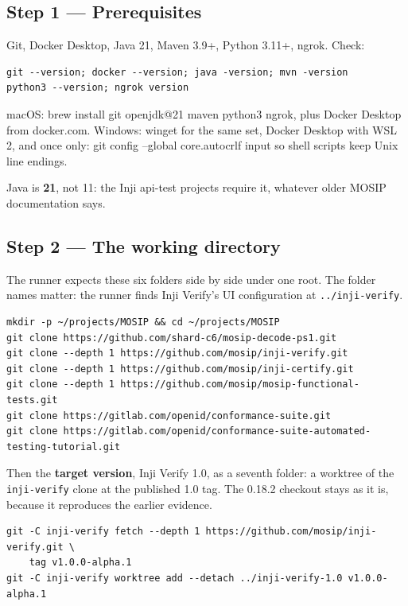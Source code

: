 \documentclass[10pt,a4paper]{article}
\newcommand{\cmd}[1]{\colorbox{box}{#1}}
\begin{document}
\subsection{Step 1 --- Prerequisites}

Git, Docker Desktop, Java 21, Maven 3.9+, Python 3.11+, ngrok. Check:

\begin{verbatim}
git --version; docker --version; java -version; mvn -version
python3 --version; ngrok version
\end{verbatim}

macOS: \cmd{brew install git openjdk@21 maven python3 ngrok}, plus Docker Desktop from
docker.com. Windows: winget for the same set, Docker Desktop with WSL 2, and once only:
\cmd{git config --global core.autocrlf input} so shell scripts keep Unix line endings.

Java is \textbf{21}, not 11: the Inji api-test projects require it, whatever older MOSIP
documentation says.

\subsection{Step 2 --- The working directory}

The runner expects these six folders side by side under one root. The folder names
matter: the runner finds Inji Verify's UI configuration at \texttt{../inji-verify}.

\begin{verbatim}
mkdir -p ~/projects/MOSIP && cd ~/projects/MOSIP
git clone https://github.com/shard-c6/mosip-decode-ps1.git
git clone --depth 1 https://github.com/mosip/inji-verify.git
git clone --depth 1 https://github.com/mosip/inji-certify.git
git clone --depth 1 https://github.com/mosip/mosip-functional-tests.git
git clone https://gitlab.com/openid/conformance-suite.git
git clone https://gitlab.com/openid/conformance-suite-automated-testing-tutorial.git
\end{verbatim}

Then the \textbf{target version}, Inji Verify 1.0, as a seventh folder: a worktree of the
\texttt{inji-verify} clone at the published 1.0 tag. The 0.18.2 checkout stays as it is,
because it reproduces the earlier evidence.

\begin{verbatim}
git -C inji-verify fetch --depth 1 https://github.com/mosip/inji-verify.git \
    tag v1.0.0-alpha.1
git -C inji-verify worktree add --detach ../inji-verify-1.0 v1.0.0-alpha.1
\end{verbatim}
\end{document}
